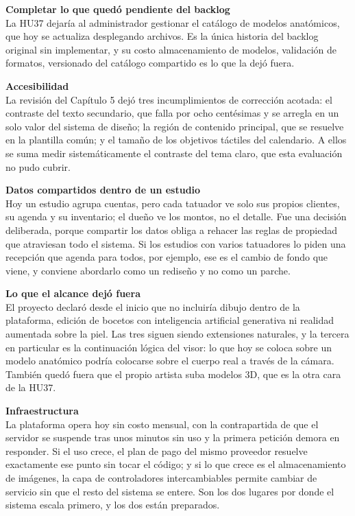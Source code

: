 \documentclass[12pt,letterpaper,oneside]{report}
\newcommand{\tituloparpegado}[1]{\par\textbf{#1}\\\indent\ignorespaces}
\begin{document}
\vspace{\parskip}
\tituloparpegado{Completar lo que quedó pendiente del backlog}
La HU37 dejaría al administrador gestionar el catálogo de modelos anatómicos, que hoy se actualiza desplegando archivos. Es la única historia del backlog original sin implementar, y su costo almacenamiento de modelos, validación de formatos, versionado del catálogo compartido es lo que la dejó fuera.



\vspace{\parskip}
\tituloparpegado{Accesibilidad}
La revisión del Capítulo 5 dejó tres incumplimientos de corrección acotada: el contraste del texto secundario, que falla por ocho centésimas y se arregla en un solo valor del sistema de diseño; la región de contenido principal, que se resuelve en la plantilla común; y el tamaño de los objetivos táctiles del calendario. A ellos se suma medir sistemáticamente el contraste del tema claro, que esta evaluación no pudo cubrir.

\vspace{\parskip}
\tituloparpegado{Datos compartidos dentro de un estudio}
Hoy un estudio agrupa cuentas, pero cada tatuador ve solo sus propios clientes, su agenda y su inventario; el dueño ve los montos, no el detalle. Fue una decisión deliberada, porque compartir los datos obliga a rehacer las reglas de propiedad que atraviesan todo el sistema. Si los estudios con varios tatuadores lo piden una recepción que agenda para todos, por ejemplo, ese es el cambio de fondo que viene, y conviene abordarlo como un rediseño y no como un parche.

\vspace{\parskip}
\tituloparpegado{Lo que el alcance dejó fuera}
El proyecto declaró desde el inicio que no incluiría dibujo dentro de la plataforma, edición de bocetos con inteligencia artificial generativa ni realidad aumentada sobre la piel. Las tres siguen siendo extensiones naturales, y la tercera en particular es la continuación lógica del visor: lo que hoy se coloca sobre un modelo anatómico podría colocarse sobre el cuerpo real a través de la cámara. También quedó fuera que el propio artista suba modelos 3D, que es la otra cara de la HU37.

\vspace{\parskip}
\tituloparpegado{Infraestructura}
La plataforma opera hoy sin costo mensual, con la contrapartida de que el servidor se suspende tras unos minutos sin uso y la primera petición demora en responder. Si el uso crece, el plan de pago del mismo proveedor resuelve exactamente ese punto sin tocar el código; y si lo que crece es el almacenamiento de imágenes, la capa de controladores intercambiables permite cambiar de servicio sin que el resto del sistema se entere. Son los dos lugares por donde el sistema escala primero, y los dos están preparados.
\end{document}
